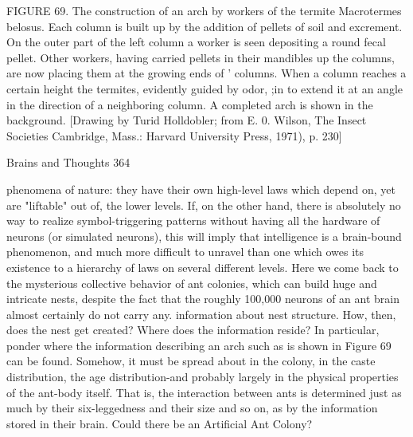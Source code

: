 FIGURE 69. The construction of an arch by workers of the termite Macrotermes belosus. Each
column is built up by the addition of pellets of soil and excrement. On the outer part of the left
column a worker is seen depositing a round fecal pellet. Other workers, having carried pellets in
their mandibles up the columns, are now placing them at the growing ends of ' columns. When a
column reaches a certain height the termites, evidently guided by odor, ;in to extend it at an angle
in the direction of a neighboring column. A completed arch is shown in the background.
[Drawing by Turid Holldobler; from E. 0. Wilson, The Insect Societies Cambridge, Mass.:
Harvard University Press, 1971), p. 230]




Brains and Thoughts                                                                            364

phenomena of nature: they have their own high-level laws which depend on, yet are
"liftable" out of, the lower levels. If, on the other hand, there is absolutely no way to
realize symbol-triggering patterns without having all the hardware of neurons (or
simulated neurons), this will imply that intelligence is a brain-bound phenomenon, and
much more difficult to unravel than one which owes its existence to a hierarchy of laws
on several different levels.
Here we come back to the mysterious collective behavior of ant colonies, which can build
huge and intricate nests, despite the fact that the roughly 100,000 neurons of an ant brain
almost certainly do not carry any. information about nest structure. How, then, does the
nest get created? Where does the information reside? In particular, ponder where the
information describing an arch such as is shown in Figure 69 can be found. Somehow, it
must be spread about in the colony, in the caste distribution, the age distribution-and
probably largely in the physical properties of the ant-body itself. That is, the interaction
between ants is determined just as much by their six-leggedness and their size and so on,
as by the information stored in their brain. Could there be an Artificial Ant Colony?

